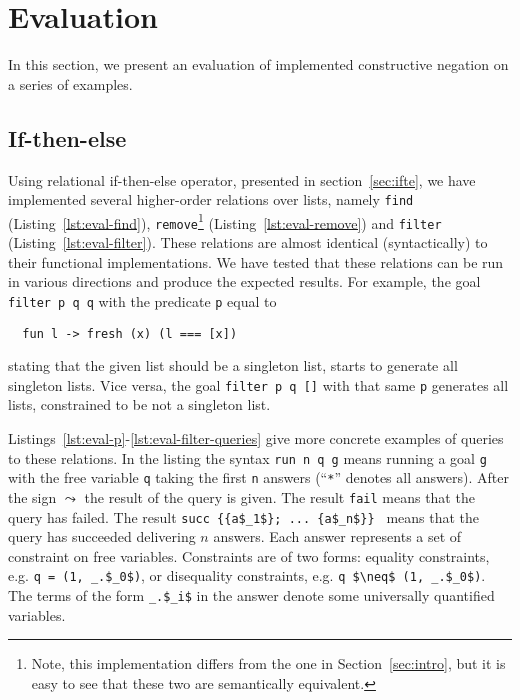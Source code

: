 \section{Evaluation}

\label{sec:evaluation}

In this section, we present an evaluation of 
implemented constructive negation on a series of examples.

\subsection{If-then-else}

Using relational if-then-else operator, 
presented in section~\ref{sec:ifte},
we have implemented several 
higher-order relations over lists, namely 
\lstinline{find} (Listing~\ref{lst:eval-find}), 
\lstinline{remove}\footnote{Note, this implementation 
differs from the one in Section~\ref{sec:intro}, but 
it is easy to see that these two are semantically equivalent.} (Listing~\ref{lst:eval-remove}) 
and \lstinline{filter} (Listing~\ref{lst:eval-filter}).
These relations are almost identical (syntactically) to their
functional implementations.
We have tested that these relations can be run
in various directions and produce the expected results.
For example, the goal \lstinline{filter p q q}
with the predicate \lstinline{p} equal to

\begin{lstlisting}
  fun l -> fresh (x) (l === [x])
\end{lstlisting}

stating that the given list should be a singleton list,
starts to generate all singleton lists.
Vice versa, the goal \lstinline{filter p q []} 
with that same \lstinline{p} generates 
all lists, constrained to be not a singleton list.

Listings~\ref{lst:eval-p}-\ref{lst:eval-filter-queries} give 
more concrete examples of queries to these relations.
In the listing the syntax \lstinline{run n q g}
means running a goal \lstinline{g} with 
the free variable \lstinline{q}
taking the first \lstinline{n} answers (``\lstinline{*}'' denotes all answers).
After the sign $\leadsto$ the result of the query is given.
The result \lstinline{fail} means that the query has failed.
The result \lstinline[mathescape]|succ {{a$_1$}; ... {a$_n$}} |
means that the query has succeeded delivering $n$ answers.
Each answer represents a set of constraint on free variables.
Constraints are of two forms: equality constraints, e.g. \lstinline{q = (1, _.$_0$)}, 
or disequality constraints, e.g. \lstinline{q $\neq$ (1, _.$_0$)}.
The terms of the form \lstinline{_.$_i$} in the answer
denote some universally quantified variables.

